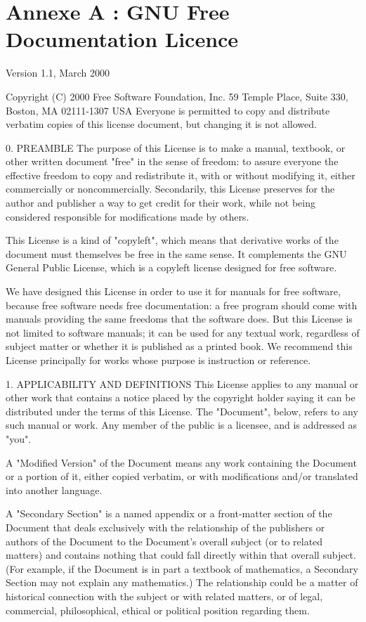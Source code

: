 \chapter*{Annexe A : GNU Free Documentation Licence}

Version 1.1, March 2000

Copyright (C) 2000 Free Software Foundation, Inc.
59 Temple Place, Suite 330, Boston, MA 02111-1307 USA
Everyone is permitted to copy and distribute verbatim copies
of this license document, but changing it is not allowed.

0. PREAMBLE
The purpose of this License is to make a manual, textbook, or other written document "free" in the sense of freedom: to assure everyone the effective freedom to copy and redistribute it, with or without modifying it, either commercially or noncommercially. Secondarily, this License preserves for the author and publisher a way to get credit for their work, while not being considered responsible for modifications made by others.

This License is a kind of "copyleft", which means that derivative works of the document must themselves be free in the same sense. It complements the GNU General Public License, which is a copyleft license designed for free software. 

We have designed this License in order to use it for manuals for free software, because free software needs free documentation: a free program should come with manuals providing the same freedoms that the software does. But this License is not limited to software manuals; it can be used for any textual work, regardless of subject matter or whether it is published as a printed book. We recommend this License principally for works whose purpose is instruction or reference.

1. APPLICABILITY AND DEFINITIONS
This License applies to any manual or other work that contains a notice placed by the copyright holder saying it can be distributed under the terms of this License. The "Document", below, refers to any such manual or work. Any member of the public is a licensee, and is addressed as "you".

A "Modified Version" of the Document means any work containing the Document or a portion of it, either copied verbatim, or with modifications and/or translated into another language.

A "Secondary Section" is a named appendix or a front-matter section of the Document that deals exclusively with the relationship of the publishers or authors of the Document to the Document's overall subject (or to related matters) and contains nothing that could fall directly within that overall subject. (For example, if the Document is in part a textbook of mathematics, a Secondary Section may not explain any mathematics.) The relationship could be a matter of historical connection with the subject or with related matters, or of legal, commercial, philosophical, ethical or political position regarding them.

